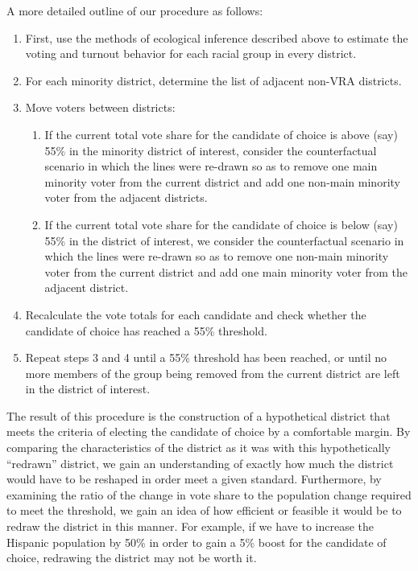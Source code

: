 \documentclass[12pt]{article}
\begin{document}
A more detailed outline of our procedure as follows:

\begin{enumerate}
\item First, use the methods of ecological inference described above
  to estimate the voting and turnout behavior for each racial group in
  every district.

\item For each minority district, determine the list of adjacent
  non-VRA districts.

\item Move voters between districts:
  \begin{enumerate}
  \item If the current total vote share for the candidate of choice is
    above (say) 55\% in the minority district of interest, consider
    the counterfactual scenario in which the lines were re-drawn so as
    to remove one main minority voter from the current district and
    add one non-main minority voter from the adjacent districts.
  \item If the current total vote share for the candidate of choice is
    below (say) 55\% in the district of interest, we consider the
    counterfactual scenario in which the lines were re-drawn so as to
    remove one non-main minority voter from the current district and
    add one main minority voter from the adjacent district.
  \end{enumerate}

\item Recalculate the vote totals for each candidate and check whether
  the candidate of choice has reached a 55\% threshold.

\item Repeat steps 3 and 4 until a 55\% threshold has been reached, or
  until no more members of the group being removed from the current
  district are left in the district of interest.
\end{enumerate}

The result of this procedure is the construction of a hypothetical
district that meets the criteria of electing the candidate of choice
by a comfortable margin. By comparing the characteristics of the
district as it was with this hypothetically ``redrawn'' district, we
gain an understanding of exactly how much the district would have to
be reshaped in order meet a given standard. Furthermore, by examining
the ratio of the change in vote share to the population change
required to meet the threshold, we gain an idea of how efficient or
feasible it would be to redraw the district in this manner. For
example, if we have to increase the Hispanic population by 50\% in
order to gain a 5\% boost for the candidate of choice, redrawing the
district may not be worth it.
\end{document}
